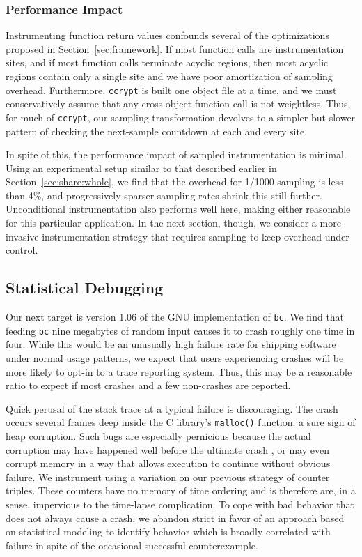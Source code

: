 \subsubsection{Performance Impact}

Instrumenting function return values confounds several of the
optimizations proposed in Section~\ref{sec:framework}.  If most
function calls are instrumentation sites, and if most function calls
terminate acyclic regions, then most acyclic regions contain only a
single site and we have poor amortization of sampling overhead.
Furthermore, \texttt{ccrypt} is built one object file at a time, and
we must conservatively assume that any cross-object function call is
not weightless.  Thus, for much of \texttt{ccrypt}, our sampling
transformation devolves to a simpler but slower pattern of checking
the next-sample countdown at each and every site.

In spite of this, the performance impact of sampled instrumentation is
minimal.  Using an experimental setup similar to that described
earlier in Section~\ref{sec:share:whole}, we find that the overhead
for 1/1000 sampling is less than 4\%, and progressively sparser
sampling rates shrink this still further.  Unconditional
instrumentation also performs well here, making either reasonable for
this particular application.  In the next section, though, we consider
a more invasive instrumentation strategy that requires sampling to
keep overhead under control.

\subsection{Statistical Debugging}
\label{sec:bc}

Our next target is version 1.06 of the GNU implementation of
\texttt{bc}.  We find that feeding \texttt{bc} nine megabytes of
random input causes it to crash roughly one time in four.  While this
would be an unusually high failure rate for shipping software under
normal usage patterns, we expect that users experiencing crashes will
be more likely to opt-in to a trace reporting system.  Thus, this may
be a reasonable ratio to expect if most crashes and a few non-crashes
are reported.

Quick perusal of the stack trace at a typical failure is discouraging.
The crash occurs several frames deep inside the C library's
\texttt{malloc()} function: a sure sign of heap corruption.  Such bugs
are especially pernicious because the actual corruption may have
happened well before the ultimate crash \cite{Eisenstadt1993b}, or may
even corrupt memory in a way that allows execution to continue without
obvious failure.  We instrument using a variation on our previous
strategy of counter triples.  These counters have no memory of time
ordering and is therefore are, in a sense, impervious to the
time-lapse complication.  To cope with bad behavior that does not
always cause a crash, we abandon strict  in favor of an approach based on
statistical modeling to identify behavior which is broadly correlated
with failure in spite of the occasional successful counterexample.

